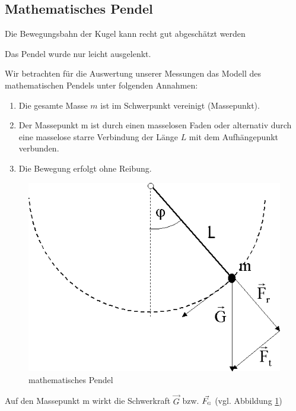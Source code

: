 \documentclass[11pt,a4paper,titlepage, ngerman]{article}
\begin{document}
		\subsection{Mathematisches Pendel}
		\label{pendel}
		
		
		Die Bewegungsbahn der Kugel kann recht gut abgeschätzt werden %
		
			Das Pendel wurde nur leicht ausgelenkt. %
			
			Wir betrachten für die Auswertung unserer Messungen das Modell des mathematischen Pendels unter folgenden Annahmen:
			
			\begin{enumerate}
				\item Die gesamte Masse $m$ ist im Schwerpunkt vereinigt (Massepunkt).
				\item Der Massepunkt m ist durch einen masselosen Faden oder alternativ durch eine masselose starre Verbindung der Länge $L$ mit dem Aufhängepunkt verbunden.
				\item Die Bewegung erfolgt ohne Reibung.
			\end{enumerate}
			
			\begin{figure}[ht]
				\centering
				\includegraphics[scale=0.4]{mathematischesPendel.png}		
				\caption{mathematisches Pendel}
				\label{fig:matpendel}
			\end{figure}
			
			Auf den Massepunkt m wirkt die Schwerkraft $ \vec{G}$ bzw. $ \vec{F_\textsc{g}}$ (vgl. Abbildung \ref{fig:matpendel}) \\
			
\end{document}
